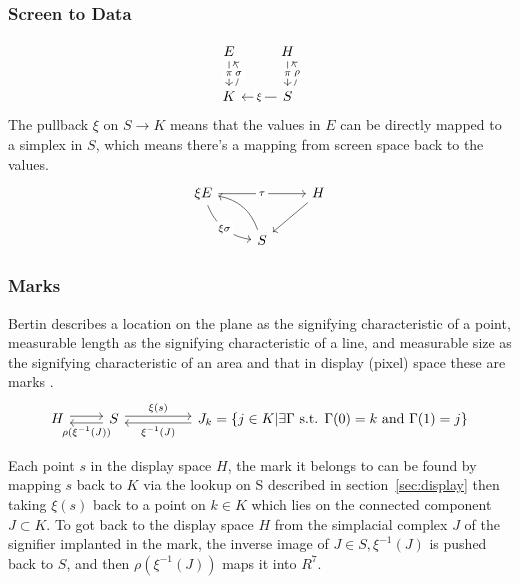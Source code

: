 \documentclass[../main.tex]{subfiles}
\begin{document}
\subsubsection{Screen to Data}
\begin{equation}
    \begin{tikzcd}
        E \arrow[d, "\pi" description] & H \arrow[d, "\pi" description]                                                 \\
        K \arrow[u, "\sigma" description, bend right] & S \arrow[l, "\xi" description] \arrow[u, "\rho" description, bend right]
    \end{tikzcd}
\end{equation}
The pullback $\xi$ on $S \rightarrow K$ means that the values in $E$ can be directly mapped to a simplex in $S$, which means there's a mapping from screen space back to the values. 
\begin{equation}
    \begin{tikzcd}
        \xi E \arrow[rr, "\tau" description] \arrow[rd, "\xi \sigma" description, bend right] &     & H \arrow[ld] \\
        & S \arrow[lu, bend right] &             
    \end{tikzcd}
\end{equation}

\subsubsection{Marks}
Bertin describes a location on the plane as the signifying characteristic of a point, measurable length as the signifying characteristic of a line, and measurable size as the signifying characteristic of an area and that in display (pixel) space these are marks \cite{bertinIIPropertiesGraphic2011,carpendaleVisualRepresentationSemiology}. 
\begin{equation}
\begin{tikzcd}
    H \arrow[r, shift left] & S \arrow[l, "\rho(\xi^{-1}(J))", shift left] \arrow[rr, "\xi(s)", shift left] &  & J_{k} =  \{j \in K| \exists \Gamma \text{ s.t. } \Gamma(0)=k \text{ and }\Gamma(1)=j\} \arrow[ll, "\xi^{-1}(J)", shift left]
\end{tikzcd}
\label{eq:mark}
\end{equation}

Each point $s$ in the display space $H$, the mark it belongs to can be found by mapping $s$ back to $K$ via the lookup on S described in section~\ref{sec:display} then taking $\xi(s)$ back to a point on $k \in K$ which lies on the connected component $J \subset K$. To got back to the display space $H$  from the simplacial complex $J$ of the signifier implanted in the mark, the inverse image of $J \in S, \xi^{-1}(J)$ is pushed back to $S$, and then  $\rho(\xi^{-1}(J))$ maps it into $R^{7}$. 
\end{document}
